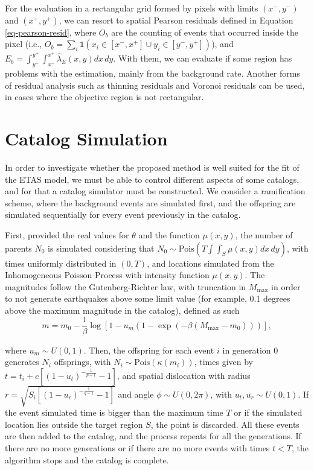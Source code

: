 For the evaluation in a rectangular grid formed by pixels with limits $(x^{-},y^{-})$ and $(x^{+}, y^{+})$, we can resort to spatial Pearson residuals defined in Equation \eqref{eq-pearson-resid}, where $O_{b}$ are the counting of events that occurred inside the pixel (i.e., $O_{b} = \sum_{i}\mathds{1}(x_{i} \in [x^{-},x^{+}] \cup y_{i} \in [y^{-}, y^{+}])$), and $E_{b} = \int_{y^{-}}^{y^{+}}\int_{x^{-}}^{x^{+}}\hat{\lambda}_{E}(x,y)dx\, dy$. With them, we can evaluate if some region has problems with the estimation, mainly from the background rate. Another forms of residual analysis such as thinning residuals and Voronoi residuals can be used, in cases where the objective region is not rectangular.

\section{Catalog Simulation}
\label{sec-cat-simulation}

In order to investigate whether the proposed method is well suited for the fit of the ETAS model, we must be able to control different aspects of some catalogs, and for that a catalog simulator must be constructed. We consider a ramification scheme, where the background events are simulated first, and the offspring are simulated sequentially for every event previously in the catalog.

First, provided the real values for $\theta$ and the function $\mu(x,y)$, the number of parents $N_{0}$ is simulated considering that $N_{0} \sim \mathrm{Pois}\left(T\int\int_{S}\mu(x,y)dx\, dy\right)$, with times uniformly distributed in $(0,T)$, and locations simulated from the Inhomogeneous Poisson Process with intensity function $\mu(x,y)$. The magnitudes follow the Gutenberg-Richter law, with truncation in $M_{\text{max}}$ in order to not generate earthquakes above some limit value (for example, 0.1 degrees above the maximum magnitude in the catalog), defined as such
\begin{equation}
  \label{eq-sim-magnitudes}
  m = m_{0} - \frac{1}{\beta}\log\left[1 - u_{m}(1 - \exp(- \beta(M_{\text{max}} - m_{0})))\right],
\end{equation}

\noindent where $u_{m} \sim U(0,1)$. Then, the offspring for each event $i$ in generation 0 generates $N_{i}$ offsprings, with $N_{i} \sim \mathrm{Pois}(\kappa(m_{i}))$, times given by $t = t_{i} + c\left[(1 - u_{t})^{-\frac{1}{p - 1}} - 1\right]$, and spatial dislocation with radius $r = \sqrt{S_{i}\left[(1 - u_{r})^{-\frac{1}{q-1}}-1\right]}$ and angle $\phi \sim U(0,2\pi)$, with $u_{t},u_{r} \sim U(0,1)$. If the event simulated time is bigger than the maximum time $T$ or if the simulated location lies outside the target region $S$, the point is discarded. All these events are then added to the catalog, and the process repeats for all the generations. If there are no more generations or if there are no more events with times $t < T$, the algorithm stops and the catalog is complete.

